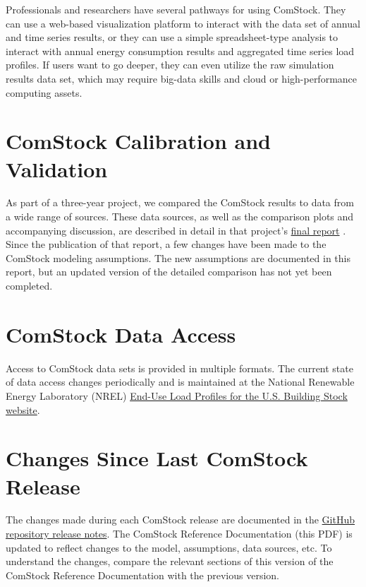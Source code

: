 Professionals and researchers have several pathways for using ComStock. They can use a web-based visualization platform to interact with the data set of annual and time series results, or they can use a simple spreadsheet-type analysis to interact with annual energy consumption results and aggregated time series load profiles. If users want to go deeper, they can even utilize the raw simulation results data set, which may require big-data skills and cloud or high-performance computing assets.

\section{ComStock Calibration and Validation}
As part of a three-year project, we compared the ComStock results to data from a wide range of sources. These data sources, as well as the comparison plots and accompanying discussion, are described in detail in that project's \href{https://www.nrel.gov/docs/fy22osti/80889.pdf}{final report} \citep{eulp_final_report}. Since the publication of that report, a few changes have been made to the ComStock modeling assumptions. The new assumptions are documented in this report, but an updated version of the detailed comparison has not yet been completed.

\section{ComStock Data Access}
Access to ComStock data sets is provided in multiple formats. The current state of data access changes periodically and is maintained at the National Renewable Energy Laboratory (NREL) \href{https://www.nrel.gov/buildings/end-use-load-profiles.html}{End-Use Load Profiles for the U.S. Building Stock website}.

\section{Changes Since Last ComStock Release}
The changes made during each ComStock release are documented in the \href{https://github.com/NREL/ComStock/releases}{GitHub repository release notes}. The ComStock Reference Documentation (this PDF) is updated to reflect changes to the model, assumptions, data sources, etc. To understand the changes, compare the relevant sections of this version of the ComStock Reference Documentation with the previous version.